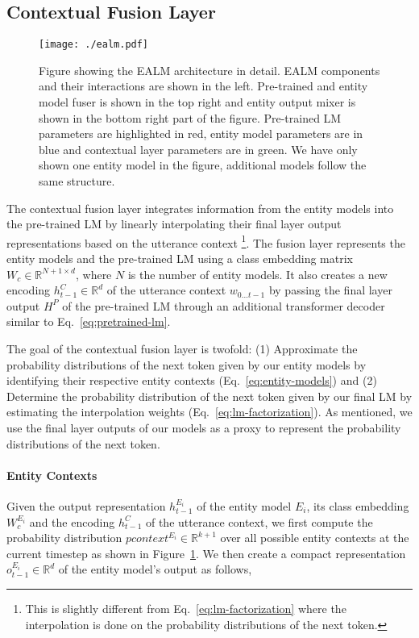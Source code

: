 \documentclass{article}
\begin{document}
\subsection{Contextual Fusion Layer}
\label{section:contextualfusion}


\begin{figure}
	\centering
	\texttt{[image: ./ealm.pdf]}
	\caption{Figure showing the EALM architecture in detail. EALM components and their interactions are shown in the left.  Pre-trained and entity model fuser is shown in the top right and entity output mixer is shown in the bottom right part of the figure. Pre-trained LM parameters are highlighted in red, entity model parameters are in blue and contextual layer parameters are in green. We have only shown one entity model in the figure, additional models follow the same structure.}
	\label{fig:ealm}
\end{figure}


The contextual fusion layer integrates information from the entity models into the pre-trained LM by linearly interpolating their final layer output representations based on the utterance context \footnote{This is slightly different from Eq.~\ref{eq:lm-factorization} where the interpolation is done on the probability distributions of the next token.}. The fusion layer represents the entity models and the pre-trained LM using a class embedding matrix $W_c \in \mathbb{R}^{N+1 \times d}$, where $N$ is the number of entity models. It also creates a new encoding $h_{t-1}^C \in \mathbb{R}^d$ of the utterance context $w_{0...t-1}$ by passing the final layer output $H^P$ of the pre-trained LM through an additional transformer decoder similar to Eq.~\ref{eq:pretrained-lm}. 

The goal of the contextual fusion layer is twofold: (1) Approximate the probability distributions of the next token given by our entity models by identifying their respective entity contexts (Eq.~\ref{eq:entity-models}) and (2)  Determine the probability distribution of the next token given by our final LM by estimating the interpolation weights (Eq.~\ref{eq:lm-factorization}). As mentioned, we use the final layer outputs of our models as a proxy to represent the probability distributions of the next token.


\paragraph{Entity Contexts} Given the output representation $h_{t-1}^{E_i}$  of the entity model $E_i$, its class embedding $W_c^{E_i}$ and the encoding $h_{t-1}^C$ of the utterance context, we first compute the probability distribution $pcontext^{E_i} \in \mathbb{R}^{k+1}$ over all possible entity contexts at the current timestep as shown in Figure~\ref{fig:ealm}. We then create a compact representation  $o_{t-1}^{E_i} \in \mathbb{R}^d$ of the entity model's output as follows,
\end{document}
